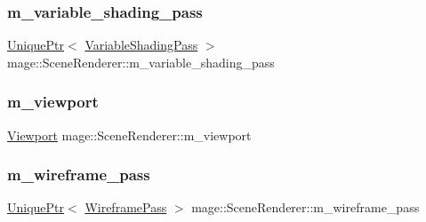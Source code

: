 \hypertarget{classmage_1_1_scene_renderer_a9ee6d267f8cfb7826c16acd4fe0b7852}{}\label{classmage_1_1_scene_renderer_a9ee6d267f8cfb7826c16acd4fe0b7852} 
\subsubsection{\texorpdfstring{m\+\_\+variable\+\_\+shading\+\_\+pass}{m\_variable\_shading\_pass}}
{\footnotesize\ttfamily \hyperlink{namespacemage_a3316d7143a973e37adf1110f2e80ca31}{Unique\+Ptr}$<$ \hyperlink{classmage_1_1_variable_shading_pass}{Variable\+Shading\+Pass} $>$ mage\+::\+Scene\+Renderer\+::m\+\_\+variable\+\_\+shading\+\_\+pass\hspace{0.3cm}{\ttfamily [private]}}

\hypertarget{classmage_1_1_scene_renderer_a10ea57172c4a79a3b4d4a8161e705437}{}\label{classmage_1_1_scene_renderer_a10ea57172c4a79a3b4d4a8161e705437} 
\subsubsection{\texorpdfstring{m\+\_\+viewport}{m\_viewport}}
{\footnotesize\ttfamily \hyperlink{structmage_1_1_viewport}{Viewport} mage\+::\+Scene\+Renderer\+::m\+\_\+viewport\hspace{0.3cm}{\ttfamily [private]}}

\hypertarget{classmage_1_1_scene_renderer_a3f84786f9ed001345c746292cb08ad2f}{}\label{classmage_1_1_scene_renderer_a3f84786f9ed001345c746292cb08ad2f} 
\subsubsection{\texorpdfstring{m\+\_\+wireframe\+\_\+pass}{m\_wireframe\_pass}}
{\footnotesize\ttfamily \hyperlink{namespacemage_a3316d7143a973e37adf1110f2e80ca31}{Unique\+Ptr}$<$ \hyperlink{classmage_1_1_wireframe_pass}{Wireframe\+Pass} $>$ mage\+::\+Scene\+Renderer\+::m\+\_\+wireframe\+\_\+pass\hspace{0.3cm}{\ttfamily [private]}}

